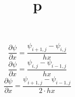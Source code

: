 \documentclass[12pt,a4paper]{article}
\title{p}
\begin{document}
	$$\frac{\partial \psi}{\partial x} = \frac{\psi_{i+1,j}-\psi_{i,j}}{hx}$$
	$$\frac{\partial \psi}{\partial x} = \frac{\psi_{i,j}-\psi_{i-1,j}}{hx}$$
	$$\frac{\partial \psi}{\partial x} = \frac{\psi_{i+1,j}-\psi_{i-1,j}}{2\cdot hx}$$
	
\end{document}
